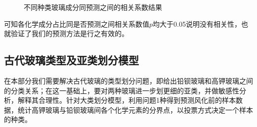 \documentclass{my_paper}
\begin{document}
\begin{figure}[htbp]
    \centering  %
    

    \caption{不同种类玻璃成分同预测之间的相关系数结果}    %
    \label{pear}    %
\end{figure}
可知各化学成分占比同是否预测之间相关系数值$ p $均大于0.05说明没有相关性，也就验证了我们的预测方法是行之有效的。

\subsection{古代玻璃类型及亚类划分模型}
在本部分我们需要解决古代玻璃的类型划分问题，即给出铅钡玻璃和高钾玻璃之间的分类关系；在这一基础上，要对两种玻璃进一步划更细的亚类，并做敏感性分析，解释其合理性。针对大类划分模型，利用问题1种得到预测风化前的样本数据，统计高钾玻璃与铅钡玻璃间各个化学元素的分界点，以投票方式决定一个样本的种类。
\end{document}
